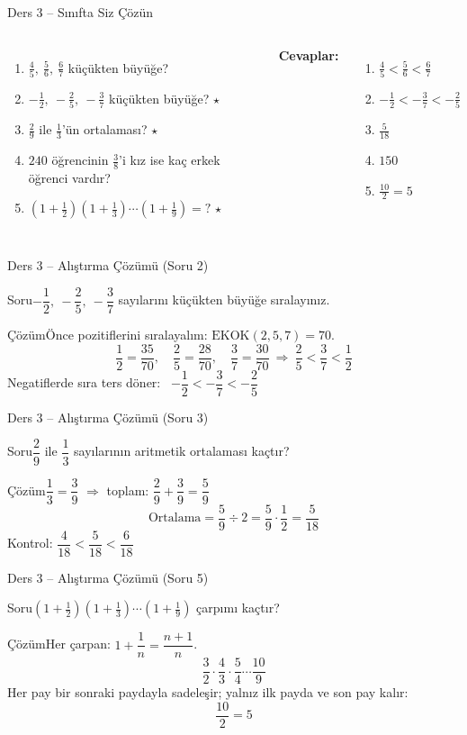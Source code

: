 \documentclass[aspectratio=169,11pt,handout]{beamer}
\newcommand{\soru}[3]{%
\begin{frame}{#1}
  \begin{block}{Soru}\large #2\end{block}
  \pause
  \begin{exampleblock}{Çözüm}\large #3\end{exampleblock}
\end{frame}}
\begin{document}
\begin{frame}{Ders 3 -- Sınıfta Siz Çözün}
\begin{columns}[t]
\begin{enumerate}
\item \(\frac{4}{5},\ \frac{5}{6},\ \frac{6}{7}\) küçükten büyüğe?
\item \(-\frac{1}{2},\ -\frac{2}{5},\ -\frac{3}{7}\) küçükten büyüğe? \(\star\)
\item \(\frac{2}{9}\) ile \(\frac{1}{3}\)'ün ortalaması? \(\star\)
\item \(240\) öğrencinin \(\frac{3}{8}\)'i kız ise kaç erkek öğrenci vardır?
\item \(\left(1+\frac{1}{2}\right)\left(1+\frac{1}{3}\right)\cdots\left(1+\frac{1}{9}\right)=?\) \(\star\)
\end{enumerate}
\pause
\textbf{Cevaplar:}
\begin{enumerate}
\item \(\frac{4}{5}<\frac{5}{6}<\frac{6}{7}\)
\item \(-\frac{1}{2}<-\frac{3}{7}<-\frac{2}{5}\)
\item \(\frac{5}{18}\)
\item \(150\)
\item \(\frac{10}{2}=5\)
\end{enumerate}
\end{columns}
\vspace{4pt}{\footnotesize \(\star\) işaretli soruların adım adım çözümü sonraki slaytlardadır.}
\end{frame}

\soru{Ders 3 -- Alıştırma Çözümü (Soru 2)}
{\(-\dfrac{1}{2},\ -\dfrac{2}{5},\ -\dfrac{3}{7}\) sayılarını küçükten büyüğe sıralayınız.}
{Önce pozitiflerini sıralayalım: \(\text{EKOK}(2,5,7)=70\).
\[\frac{1}{2}=\frac{35}{70},\quad \frac{2}{5}=\frac{28}{70},\quad \frac{3}{7}=\frac{30}{70}\ \Rightarrow\ \frac{2}{5}<\frac{3}{7}<\frac{1}{2}\]
Negatiflerde sıra ters döner: \ \(-\dfrac{1}{2}<-\dfrac{3}{7}<-\dfrac{2}{5}\)}

\soru{Ders 3 -- Alıştırma Çözümü (Soru 3)}
{\(\dfrac{2}{9}\) ile \(\dfrac{1}{3}\) sayılarının aritmetik ortalaması kaçtır?}
{\(\dfrac{1}{3}=\dfrac{3}{9}\) \(\Rightarrow\) toplam: \(\dfrac{2}{9}+\dfrac{3}{9}=\dfrac{5}{9}\)
\[\text{Ortalama}=\frac{5}{9}\div 2=\frac{5}{9}\cdot\frac{1}{2}=\frac{5}{18}\]
Kontrol: \(\dfrac{4}{18}<\dfrac{5}{18}<\dfrac{6}{18}\) \checkmark}

\soru{Ders 3 -- Alıştırma Çözümü (Soru 5)}
{\(\left(1+\frac{1}{2}\right)\left(1+\frac{1}{3}\right)\cdots\left(1+\frac{1}{9}\right)\) çarpımı kaçtır?}
{Her çarpan: \(1+\dfrac{1}{n}=\dfrac{n+1}{n}\).
\[\frac{3}{2}\cdot\frac{4}{3}\cdot\frac{5}{4}\cdots\frac{10}{9}\]
Her pay bir sonraki paydayla sadeleşir; yalnız ilk payda ve son pay kalır:
\[\frac{10}{2}=5\]}
\end{document}

